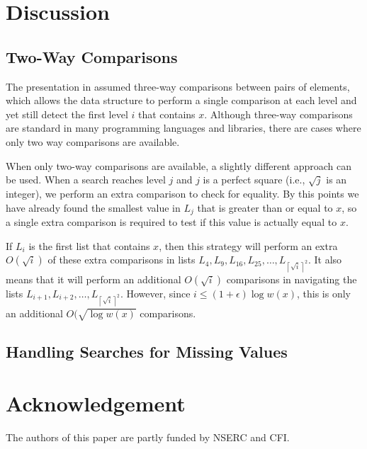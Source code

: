 \documentclass[lotsofwhite]{patmorin}
\begin{document}
\section{Discussion}

\subsection{Two-Way Comparisons}

The presentation in  assumed three-way comparisons
between pairs of elements, which allows the data structure to perform a
single comparison at each level and yet still detect the first level $i$
that contains $x$.  Although three-way comparisons are standard in many
programming languages and libraries, there are cases where only two way
comparisons are available.

When only two-way comparisons are available, a slightly different approach
can be used.  When a search reaches level $j$ and $j$ is a perfect square
(i.e., $\sqrt{j}$ is an integer), we perform an extra comparison to
check for equality.  By this points we have already found the smallest
value in $L_j$ that is greater than or equal to $x$, so a single extra
comparison is required to test if this value is actually equal to $x$.

If $L_i$ is the first list that contains $x$, then this strategy
will perform an extra $O(\sqrt{i})$ of these extra comparisons in
lists $L_4,L_9,L_{16},L_{25},\ldots,L_{\left\lceil\sqrt{i}\right\rceil^2}$.  It also
means that it will perform an additional $O(\sqrt{i})$ comparisons in
navigating the lists $L_{i+1},L_{i+2},\ldots,L_{\left\lceil\sqrt{i}\right\rceil^2}$.
However, since $i\le (1+\epsilon)\log w(x)$, this is only an additional
$O(\sqrt{\log w(x)}$ comparisons.

\subsection{Handling Searches for Missing Values}

\section*{Acknowledgement}

The authors of this paper are partly funded by NSERC and CFI.




\newpage
\end{document}
